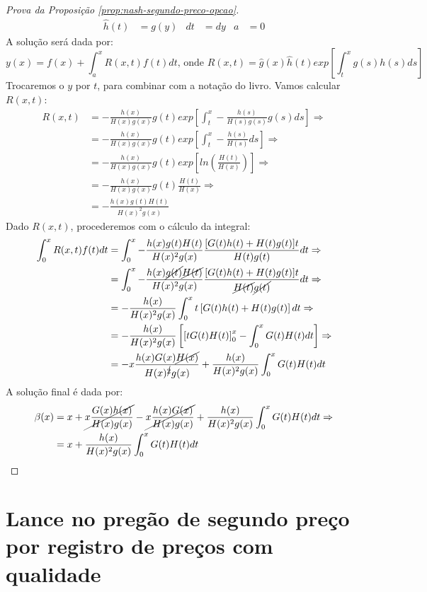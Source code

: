 \begin{proof}[Prova da Proposição \ref{prop:nash-segundo-preco-opcao}]
\begin{align*}
		\widehat{h}(t) & = g(y) & dt &= dy & a &= 0
	\end{align*}
	A solução será dada por:
	\begin{equation*}
		y(x) = f(x) + \int_a^x R(x,t)f(t)dt \text{, onde } R(x,t) = \widehat{g}(x)\widehat{h}(t)exp\left[ \int_t^x g(s)h(s)ds \right]
	\end{equation*}
	Trocaremos o $y$ por $t$, para combinar com a notação do livro. Vamos calcular $R(x,t)$:
	\begin{align*}
		R(x,t) & = -\frac{h(x)}{H(x)g(x)} g(t) exp\left[ \int_t^x -\frac{h(s)}{H(s)g(s)}g(s)ds \right] \Rightarrow \\
		& = -\frac{h(x)}{H(x)g(x)} g(t) exp\left[ \int_t^x -\frac{h(s)}{H(s)}ds \right] \Rightarrow \\
		& = -\frac{h(x)}{H(x)g(x)} g(t) exp\left[ ln \left( \frac{H(t)}{H(x)} \right) \right] \Rightarrow \\
		& = -\frac{h(x)}{H(x)g(x)} g(t) \frac{H(t)}{H(x)} \Rightarrow \\
		& = -\frac{h(x)g(t)H(t)}{H(x)^2g(x)}
	\end{align*}
	Dado $R(x,t)$, procederemos com o cálculo da integral:
	\begin{align*}
		\int_0^x R(x,t)f(t)dt & = \int_0^x -\frac{h(x)g(t)H(t)}{H(x)^2g(x)} \frac{[G(t)h(t)+H(t)g(t)]t}{H(t)g(t)} dt \Rightarrow \\
		& = \int_0^x -\frac{h(x)\cancel{g(t)}\cancel{H(t)}}{H(x)^2g(x)} \frac{[G(t)h(t)+H(t)g(t)]t}{\cancel{H(t)}\cancel{g(t)}} dt \Rightarrow \\
		& = -\frac{h(x)}{H(x)^2g(x)} \int_0^x  t \left[ G(t)h(t)+H(t)g(t) \right] dt \Rightarrow \\
		& = -\frac{h(x)}{H(x)^2g(x)} \left[ \left[ tG(t)H(t) \right]_0^x -\int_0^x G(t)H(t)dt \right] \Rightarrow \\
		& = -x \frac{h(x)G(x)\cancel{H(x)}}{H(x)^{\cancel{2}}g(x)} + \frac{h(x)}{H(x)^2g(x)}\int_0^x G(t)H(t)dt
	\end{align*}
	A solução final é dada por:
	\begin{align*}
		\beta(x) & = x + \cancel{x \frac{G(x)h(x)}{H(x)g(x)}} - \cancel{x \frac{h(x)G(x)}{H(x)g(x)}} + \frac{h(x)}{H(x)^2g(x)}\int_0^x G(t)H(t)dt \Rightarrow \\
		& = x + \frac{h(x)}{H(x)^2g(x)}\int_0^x G(t)H(t)dt
	\end{align*}
\end{proof}

\section{Lance no pregão de segundo preço por registro de preços com qualidade}

